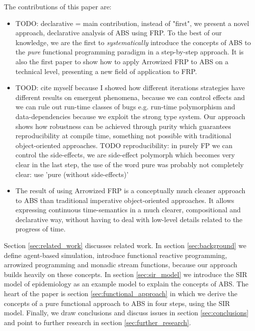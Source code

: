 The contributions of this paper are:
\begin{itemize}
	\item TODO: declarative = main contribution, instead of "first", we present a novel approach, declarative analysis of ABS using FRP. To the best of our knowledge, we are the first to \textit{systematically} introduce the concepts of ABS to the \textit{pure} functional programming paradigm in a step-by-step approach. It is also the first paper to show how to apply Arrowized FRP to ABS on a technical level, presenting a new field of application to FRP.
	\item TOOD: cite myself because I showed how different iterations strategies have different results on emergent phenomena,  because we can control effects and we can rule out run-time classes of bugs e.g. run-time polymorphism and data-dependencies because we exploit the strong type system. Our approach shows how robustness can be achieved through purity which guarantees reproducibility at compile time, something not possible with traditional object-oriented approaches.
	TODO reproducibility: in purely FP we can control the side-effects, we are side-effect polymorph which becomes very clear in the last step, the use of the word pure was probably not completely clear: use 'pure (without side-effects)'
	\item The result of using Arrowized FRP is a conceptually much cleaner approach to ABS than traditional imperative object-oriented approaches. It allows expressing continuous time-semantics in a much clearer, compositional and declarative way, without having to deal with low-level details related to the progress of time.
\end{itemize}

Section \ref{sec:related_work} discusses related work. In section \ref{sec:background} we define agent-based simulation, introduce functional reactive programming, arrowized programming and monadic stream functions, because our approach builds heavily on these concepts. In section \ref{sec:sir_model} we introduce the SIR model of epidemiology as an example model to explain the concepts of ABS. The heart of the paper is section \ref{sec:functional_approach} in which we derive the concepts of a pure functional approach to ABS in four steps, using the SIR model. Finally, we draw conclusions and discuss issues in section \ref{sec:conclusions} and point to further research in section \ref{sec:further_research}.

